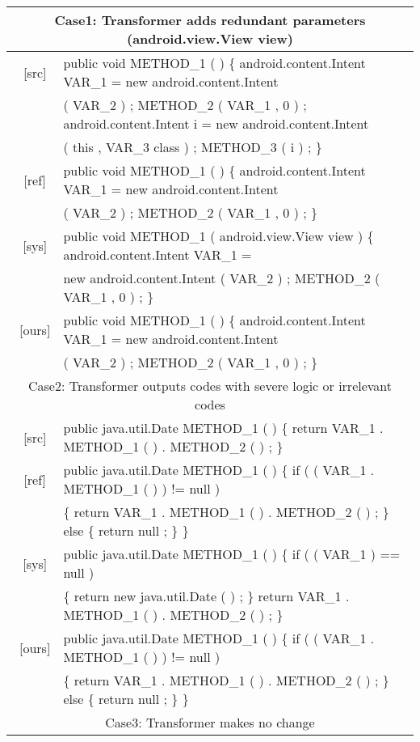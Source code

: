 \documentclass{article} \usepackage{iclr2021_conference,times}
\begin{document}
\begin{table*}[h!]
\small
\begin{center}
\begin{tabular}{c|l}
\toprule 
\multicolumn{2}{c}{Case1: Transformer adds redundant parameters (android.view.View view)} \\
\midrule
\ [src] & public void METHOD\_1 ( ) \{ android.content.Intent VAR\_1 = new android.content.Intent \\ 
& ( VAR\_2 ) ; METHOD\_2 ( VAR\_1 , 0 ) ; android.content.Intent i = new android.content.Intent \\
& ( this , VAR\_3 class ) ; METHOD\_3 ( i ) ; \} \\
\hline
\ [ref] & public void METHOD\_1 ( ) \{ android.content.Intent VAR\_1 = new android.content.Intent \\ 
& ( VAR\_2 ) ; METHOD\_2 ( VAR\_1 , 0 ) ; \} \\
\hline
\ [sys] & public void METHOD\_1 ( android.view.View view ) \{ android.content.Intent VAR\_1 = \\
& new android.content.Intent ( VAR\_2 ) ; METHOD\_2 ( VAR\_1 , 0 ) ; \} \\
\hline
\ [ours] & public void METHOD\_1 ( ) \{ android.content.Intent VAR\_1 = new android.content.Intent \\ 
& ( VAR\_2 ) ; METHOD\_2 ( VAR\_1 , 0 ) ; \}\\
\midrule
\multicolumn{2}{c}{Case2: Transformer outputs codes with severe logic or irrelevant codes} \\
\midrule
\ [src] & public java.util.Date METHOD\_1 ( ) \{ return VAR\_1 . METHOD\_1 ( ) . METHOD\_2 ( ) ; \} \\
\hline
\ [ref] & public java.util.Date METHOD\_1 ( ) \{ if ( ( VAR\_1 . METHOD\_1 ( ) ) != null ) \\
& \{ return VAR\_1 . METHOD\_1 ( ) . METHOD\_2 ( ) ; \} else \{ return null ; \} \} \\
\hline
\ [sys] & public java.util.Date METHOD\_1 ( ) \{ if ( ( VAR\_1 ) == null ) \\
& \{ return new java.util.Date ( ) ; \} return VAR\_1 . METHOD\_1 ( ) . METHOD\_2 ( ) ; \} \\ 
\hline
\ [ours] & public java.util.Date METHOD\_1 ( ) \{ if ( ( VAR\_1 . METHOD\_1 ( ) ) != null ) \\
& \{ return VAR\_1 . METHOD\_1 ( ) . METHOD\_2 ( ) ; \} else \{ return null ; \} \}\\
\midrule
\multicolumn{2}{c}{Case3: Transformer makes no change} \\

\end{tabular}
\end{center}
\end{table*}
\end{document}
